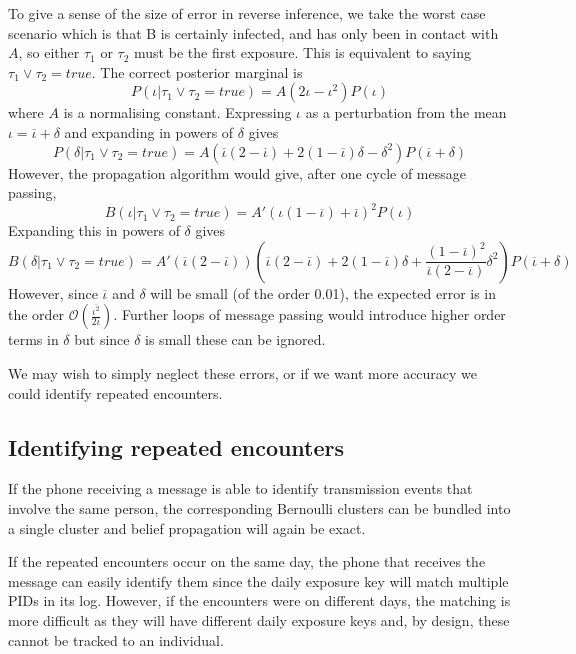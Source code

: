 \documentclass{article}
\begin{document}
To give a sense of the size of error in reverse inference, we take the worst case scenario which is that B is certainly infected, and has only been in contact with $A$, so either $\tau_1$ or $\tau_2$ must be the first exposure. This is equivalent to saying $\tau_1 \vee \tau_2 = true$. The correct posterior marginal is
\[
P(\iota | \tau_1 \vee \tau_2 = true) = A\left(2\iota - \iota^2\right)P(\iota)
\]
where $A$ is a normalising constant. Expressing $\iota$ as a perturbation from the mean $\iota = \overline{\iota} + \delta$ and expanding in powers of $\delta$ gives
\[
P(\delta | \tau_1 \vee \tau_2 = true) = A\left(\overline{\iota}(2 - \overline{\iota}) + 2(1-\overline{\iota})\delta - \delta^2\right)P(\overline{\iota}+\delta)
\]
 However, the propagation algorithm would give, after one cycle of message passing, 
\[
B(\iota | \tau_1 \vee \tau_2 = true) = A' (\iota(1 - \overline\iota) + \overline{\iota})^2P(\iota)
\]
Expanding this in powers of $\delta$ gives
\[
B(\delta | \tau_1 \vee \tau_2 = true) = A'(\overline{\iota}(2 - \overline{\iota})) \left(
\overline{\iota}(2 - \overline{\iota}) +
2(1-\overline{\iota})\delta +
\frac{(1-\overline{\iota})^2}{\overline{\iota}(2 - \overline{\iota})}\delta^2
\right)P(\overline{\iota}+\delta)
\]
However, since $\overline{\iota}$ and $\delta$ will be small (of the order 0.01\cite{luo2020modes}), the expected error is in the order $\mathcal{O}\left(\frac{\overline{\iota^2}}{2\overline{\iota}}\right)$. Further loops of message passing would introduce higher order terms in $\delta$ but since $\delta$ is small these can be ignored.

We may wish to simply neglect these errors, or if we want more accuracy we could identify repeated encounters.

\subsection{Identifying repeated encounters}

If the phone receiving a message is able to identify transmission events that involve the same person, the corresponding Bernoulli clusters can be bundled into a single cluster and belief propagation will again be exact.

If the repeated encounters occur on the same day, the phone that receives the message can easily identify them since the daily exposure key will match multiple PIDs in its log. However, if the encounters were on different days, the matching is more difficult as they will have different daily exposure keys and, by design, these cannot be tracked to an individual.
\end{document}
